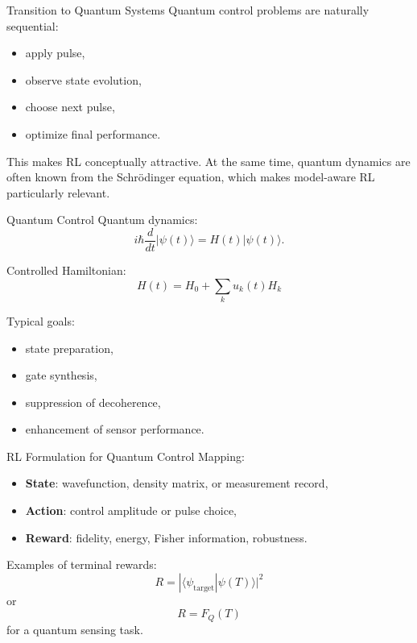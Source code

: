 \documentclass[aspectratio=169]{beamer}
\begin{document}
\begin{frame}{Transition to Quantum Systems}
  Quantum control problems are naturally sequential:
  \begin{itemize}
  \item apply pulse,
  \item observe state evolution,
  \item choose next pulse,
  \item optimize final performance.
  \end{itemize}

  This makes RL conceptually attractive.
At the same time, quantum dynamics are often known from the Schr\"odinger equation, which makes model-aware RL particularly relevant.
\end{frame}

\begin{frame}{Quantum Control}
  Quantum dynamics:
  \[
  i\hbar \frac{d}{dt}\vert \psi(t)\rangle = H(t)\vert \psi(t)\rangle.
  \]

  Controlled Hamiltonian:
  \[
  H(t)=H_0+\sum_k u_k(t)H_k
  \]

  Typical goals:
  \begin{itemize}
  \item state preparation,
  \item gate synthesis,
  \item suppression of decoherence,
  \item enhancement of sensor performance.
  \end{itemize}
\end{frame}


\begin{frame}{RL Formulation for Quantum Control}
  Mapping:
  \begin{itemize}
  \item \textbf{State}: wavefunction, density matrix, or measurement record,
  \item \textbf{Action}: control amplitude or pulse choice,
  \item \textbf{Reward}: fidelity, energy, Fisher information, robustness.
  \end{itemize}

  Examples of terminal rewards:
  \[
  R = |\langle \psi_{\mathrm{target}}|\psi(T)\rangle|^2
  \]
  or
  \[
  R = F_Q(T)
  \]
  for a quantum sensing task.
\end{frame}
\end{document}
